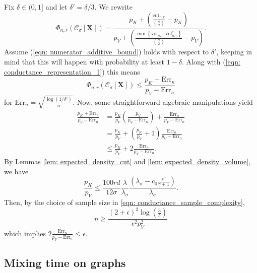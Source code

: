 \documentclass{article}
\newcommand{\set}[1]{\left\{#1\right\}}
\newcommand{\vol}{\mathrm{vol}}
\newcommand{\1}{\mathbf{1}}
\newcommand{\Err}{\mathrm{Err}}
\newcommand{\cut}{\mathrm{cut}}
\newcommand{\Xbf}{\mathbf{X}}
\newcommand{\Cset}{\mathcal{C}}
\newcommand{\Csig}{\Cset_{\sigma}}
\theoremstyle{aldenthm}
\begin{document}
Fix $\delta \in (0,1]$ and let $\delta' = \delta/3$. We rewrite
\begin{equation}
\label{eqn: conductance_representation_1}
\Phi_{n,r}(\Csig[\Xbf]) = \frac{p_K + \left(\frac{\cut_{n,r}}{{n \choose 2}} - p_K\right)}{p_V + \left(\frac{\min\set{\vol_{n,r}, \vol_{n,r}^c}}{{n \choose 2}} - p_V\right)}.
\end{equation}
Assume (\ref{eqn: numerator_additive_bound}) holds with respect to $\delta'$, keeping in mind that this will happen with probability at least $1 - \delta$. Along with (\ref{eqn: conductance_representation_1}) this means
\begin{equation*}
\Phi_{n,r}(\Csig[\mathbf{X}]) \leq \frac{p_K + \Err_n}{p_V - \Err_n}
\end{equation*}
for $\Err_n = \sqrt{\frac{\log(1/\delta')}{n}}$.
Now, some straightforward algebraic manipulations yield
\begin{align*}
\frac{p_K + \Err_n}{p_V - \Err_n} & = \frac{p_K}{p_V} \left(\frac{p_V}{p_V - \Err_n}\right) + \frac{\Err_n}{p_V - \Err_n} \\
& = \frac{p_K}{p_V} + \left(\frac{p_K}{p_V} + 1\right)\frac{\Err_n}{p_V - \Err_n} \\
& \leq \frac{p_K}{p_V} + 2 \frac{\Err_n}{p_V - \Err_n}.
\end{align*}
By Lemmas \ref{lem: expected_density_cut} and \ref{lem: expected_density_volume}, we have
\begin{equation*}
\frac{p_K}{p_V} \leq \frac{100rd}{12\sigma} \frac{\lambda}{\lambda_{\sigma}} \frac{\left(\lambda_{\sigma} - c_0\frac{r^{\gamma}}{\gamma + 1}\right)}{\lambda_{\sigma}}.
\end{equation*}
Then, by the choice of sample size in \eqref{eqn: conductance_sample_complexity}, 
\begin{equation*}
n \geq \frac{(2 + \epsilon)^2 \log\left(\frac{3}{\delta}\right)}{\epsilon^2 p_V^2}
\end{equation*}
which implies $2 \frac{\Err_n}{p_V - \Err_n} \leq \epsilon$. 

\subsection{Mixing time on graphs}
\label{sec: mixing_time_on_graphs}
\end{document}
